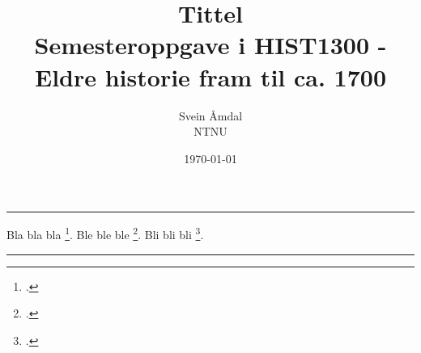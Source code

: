 \documentclass[12pt, a4paper, norsk]{article}
\title{\huge{\textbf{Tittel}}\\ \large{Semesteroppgave i HIST1300 - Eldre historie fram til ca. 1700}}
\author{\huge{Svein Åmdal} \\ \large{NTNU}}
\date{\today} %
\begin{document}
\maketitle
\hrule
\vspace{1cm}
\setcounter{page}{1}

Bla bla bla \footcite[20]{Ødegård}. Ble ble ble \footcite[27--30]{Ødegård}. Bli bli bli \footcite[4,22-23,45]{Wiesner-Hanks,Pounds}.


% 

\lipsum[1-2]





\vspace{1cm}
\hrule
\printbibliography[title=Litteratur]
\end{document}
